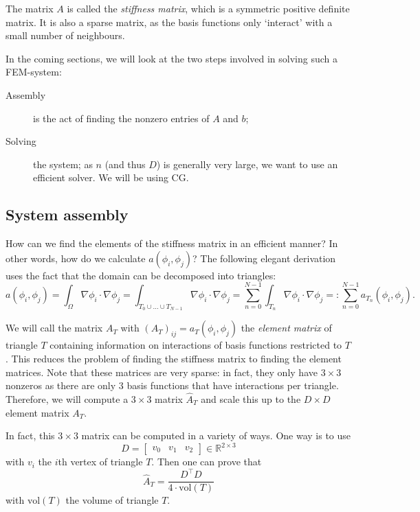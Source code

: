 \documentclass[11pt]{amsart}
\theoremstyle{definition}
\newcommand{\R}{\mathbb{R}}
\begin{document}
The matrix $A$ is called the \emph{stiffness matrix}, which is \cite{TODORAYMOND} a symmetric positive definite matrix. It is also a sparse matrix, as the basis functions only `interact' with a small number of neighbours.

In the coming sections, we will look at the two steps involved in solving such a FEM-system:
\begin{description}
  \item[Assembly] is the act of finding the nonzero entries of $A$ and $b$;
  \item[Solving] the system; as $n$ (and thus $D$) is generally very large, we want to use an efficient solver. We will be using CG.
\end{description}

\subsection{System assembly}
How can we find the elements of the stiffness matrix in an efficient manner? In other words, how do we calculate $a(\phi_i, \phi_j)$? The following elegant derivation uses the fact that the domain can be decomposed into triangles:
\begin{equation}
  \label{eqn:div}
	a(\phi_i, \phi_j) = \int_\Omega \nabla \phi_i \cdot \nabla \phi_j = \int_{T_0 \cup \dots \cup T_{N-1}} \nabla \phi_i \cdot \nabla \phi_j = \sum_{n = 0}^{N-1} \int_{T_n} \nabla \phi_i \cdot \nabla \phi_j =: \sum_{n=0}^{N-1}a_{T_n}(\phi_i, \phi_j).
\end{equation}

We will call the matrix $A_T$ with $(A_T)_{ij} = a_T(\phi_i, \phi_j)$ the \emph{element matrix} of triangle $T$ containing information on interactions of basis functions restricted to $T$. This reduces the problem of finding the stiffness matrix to finding the element matrices. Note that these matrices are very sparse: in fact, they only have $3 \times 3$ nonzeros as there are only 3 basis functions that have interactions per triangle. Therefore, we will compute a $3 \times 3$ matrix $\hat A_T$ and scale this up to the $D \times D$ element matrix $A_T$.


In fact, this $3 \times 3$ matrix can be computed in a variety of ways. One way is to use
\[
  D = \begin{bmatrix} v_{0} & v_{1} & v_{2} \end{bmatrix} \in \R^{ 2 \times 3}
\]
with $v_{i}$ the $i$th vertex of triangle $T$. Then one can prove \cite{TODO} that
\[
  \hat A_T = \frac{D^\top D}{4 \cdot \text{vol}(T)}
\]
with $\text{vol}(T)$ the volume of triangle $T$.
\end{document}
